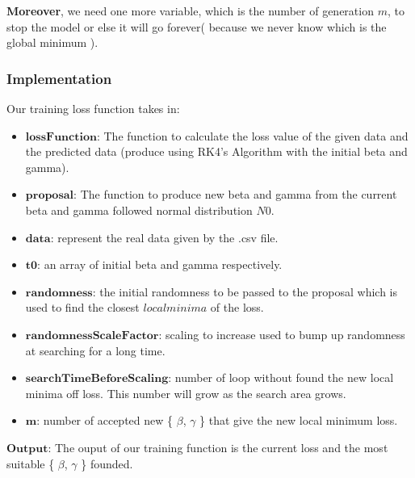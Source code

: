 \documentclass[a4paper]{article}
\begin{document}
    \textbf{Moreover}, we need one more variable, which is the number of generation $m$, to stop the model or else it will go forever( because we never know which is the global minimum ).
    
    
    \subsubsection{Implementation}
    Our training loss function takes in:
    \begin{itemize}
        \item $\textbf{lossFunction}$: The function to calculate the loss value of the given data and the predicted data (produce using RK4's Algorithm with the initial beta and gamma).
        
        \item $\textbf{proposal}$: The function to produce new beta and gamma from the current beta and gamma followed normal distribution $N0$.
        
        \item $\textbf{data}$: represent the real data given by the .csv file.
        
        \item $\textbf{t0}$: an array of initial beta and gamma respectively.
        
        \item $\textbf{randomness}$: the initial randomness to be passed to the proposal which is used to find the closest $local minima$ of the loss.
        
        \item $\textbf{randomnessScaleFactor}$: scaling to increase used to bump up randomness at searching for a long time.
        
        \item $\textbf{searchTimeBeforeScaling}$: number of loop without found the new local minima off loss. This number will grow as the search area grows.
        
        \item $\textbf{m}$: number of accepted new \{ $\beta$, $\gamma$ \} that give the new local minimum loss.
    \end{itemize}
    $\textbf{Output}$:
    The ouput of our training function is the current loss and the most suitable \{ $\beta$, $\gamma$ \} founded.
        
    
    
\end{document}
